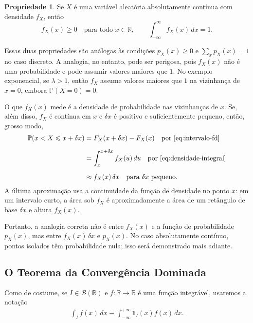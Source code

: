 \documentclass[12pt,portuguese]{article}
\theoremstyle{definition}
\theoremstyle{plainexercise}
\theoremstyle{starredexercise}
\theoremstyle{definition}
\newtheorem*{property}{Propriedade}
\begin{document}
\begin{property}
  Se $X$ é uma variável aleatória absolutamente contínua com densidade $f_X$, então
  \[
    f_X(x) \geqslant 0 \quad \text{para todo } x \in \mathbb{R},
    \qquad
    \int_{-\infty}^{\infty} f_X(x)\,dx = 1.
  \]
\end{property}

Essas duas propriedades são análogas às condições $p_X(x)\geqslant0$ e
$\sum_xp_X(x)=1$ no caso discreto. A analogia, no entanto, pode ser
perigosa, pois $f_X(x)$ não é uma probabilidade e pode assumir valores
maiores que $1$. No exemplo exponencial, se $\lambda>1$, então $f_X$ assume
valores maiores que $1$ na vizinhança de $x=0$, embora $\mathbb{P}(X=0)=0$.

O que $f_X(x)$ mede é a densidade de probabilidade nas vizinhanças de $x$.
Se, além disso, $f_X$ é contínua em $x$ e $\delta x$ é positivo e
suficientemente pequeno, então, grosso modo,
\begin{align}
  \mathbb{P}(x < X \leqslant x + \delta x)
    &= F_X(x + \delta x) - F_X(x)
       \quad \text{por \eqref{eq:intervalo-fd}} \notag \\[0.2cm]
    &= \int_x^{x + \delta x} f_X(u)\,du
       \quad \text{por \eqref{eq:densidade-integral}} \notag \\[0.2cm]
    &\approx f_X(x)\,\delta x
       \quad \text{para } \delta x \text{ pequeno}.
       \label{eq:densidade-aprox}
\end{align}
A última aproximação usa a continuidade da função de densidade no ponto $x$:
em um intervalo curto, a área sob $f_X$ é aproximadamente a área de um
retângulo de base $\delta x$ e altura $f_X(x)$.

Portanto, a analogia correta não é entre $f_X(x)$ e a função de probabilidade
$p_X(x)$, mas entre $f_X(x)\,\delta x$ e $p_X(x)$. No caso absolutamente
contínuo, pontos isolados têm probabilidade nula; isso será demonstrado mais
adiante.

\subsection{O Teorema da Convergência Dominada}

Como de costume, se $I\in\mathscr{B}(\mathbb{R})$ e $f:\mathbb{R}\to\mathbb{R}$
é uma função integrável, usaremos a notação
\begin{align*}
  \int_{I} f(x)\, dx \equiv \int_{-\infty}^{+\infty}
\mathds{1}_{I}(x)f(x)\,dx.
\end{align*}
\end{document}

